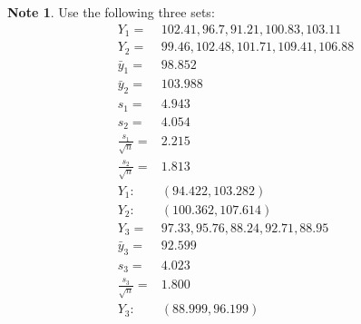 \documentclass[11pt]{article}
\theoremstyle{definition}
\newtheorem{note}{Note}
\begin{document}
\begin{note}
	Use the following three sets:
	$$
		\begin{aligned}
			Y_1 = & 102.41, 96.7, 91.21, 100.83, 103.11 \\
			Y_2 = & 99.46, 102.48, 101.71, 109.41, 106.88 \\
			\bar{y}_1 = & 98.852 \\
			\bar{y}_2 = & 103.988 \\
			s_1 = & 4.943 \\
			s_2 = & 4.054 \\
			\frac{s_1}{\sqrt{n}} = & 2.215 \\
			\frac{s_2}{\sqrt{n}} = & 1.813 \\
			Y_1: & (94.422, 103.282) \\
			Y_2: & (100.362, 107.614) \\
			Y_3 = & 97.33, 95.76, 88.24, 92.71, 88.95 \\
			\bar{y}_3 = & 92.599 \\
			s_3 = & 4.023 \\
			\frac{s_3}{\sqrt{n}} = & 1.800 \\
			Y_3: & (88.999, 96.199) \\
		\end{aligned}
	$$
\end{note}
\end{document}
